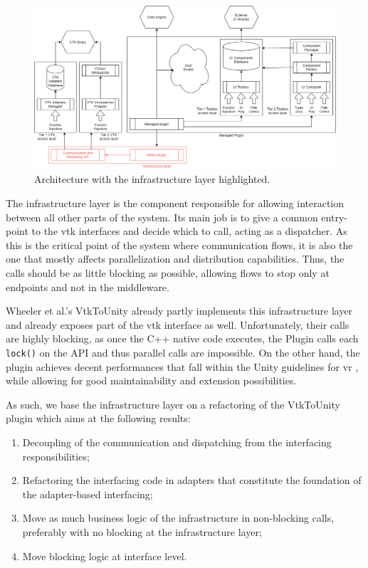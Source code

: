 \begin{figure}
    \centering
    \includegraphics[width=\textwidth]{pictures/Architecture-v0.3-infra.png}
    \caption{Architecture with the infrastructure layer highlighted.}
    \label{fig:arch-infra}
\end{figure}

The infrastructure layer is the component responsible for allowing interaction between all other parts of the system. Its main job is to give a common entry-point to the \acrshort{vtk} interfaces and decide which to call, acting as a dispatcher. As this is the critical point of the system where communication flows, it is also the one that mostly affects parallelization and distribution capabilities. Thus, the calls should be as little blocking as possible, allowing flows to stop only at endpoints and not in the middleware.

Wheeler et al.'s VtkToUnity \cite{wheeler_virtual_2018} already partly implements this infrastructure layer and already exposes part of the \acrshort{vtk} interface as well. Unfortunately, their calls are highly blocking, as once the C++ native code executes, the Plugin calls each \verb|lock()| on the API and thus parallel calls are impossible. On the other hand, the plugin achieves decent performances that fall within the Unity guidelines for \acrshort{vr} \cite{unity_vr_2020}, while allowing for good maintainability and extension possibilities.

As such, we base the infrastructure layer on a refactoring of the VtkToUnity plugin which aims at the following results:

\begin{enumerate}
    \item Decoupling of the communication and dispatching from the interfacing responsibilities;
    \item Refactoring the interfacing code in adapters that constitute the foundation of the adapter-based interfacing;
    \item Move as much business logic of the infrastructure in non-blocking calls, preferably with no blocking at the infrastructure layer;
    \item Move blocking logic at interface level.
\end{enumerate}

